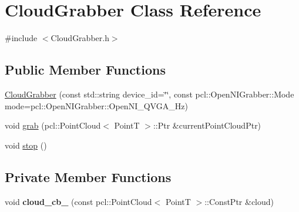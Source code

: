 \hypertarget{classCloudGrabber}{\section{Cloud\-Grabber Class Reference}
\label{classCloudGrabber}
}


{\ttfamily \#include $<$Cloud\-Grabber.\-h$>$}

\subsection*{Public Member Functions}
\begin{DoxyCompactItemize}
\item 
\hyperlink{classCloudGrabber_a0588e520a70880ab4ac1f8052954b956}{Cloud\-Grabber} (const std\-::string device\-\_\-id=\char`\"{}\char`\"{}, const pcl\-::\-Open\-N\-I\-Grabber\-::\-Mode mode=pcl\-::\-Open\-N\-I\-Grabber\-::\-Open\-N\-I\-\_\-\-Q\-V\-G\-A\-\_\-Hz)
\item 
void \hyperlink{classCloudGrabber_aa43eeeef0931d284e5fcf65669e3cbb8}{grab} (pcl\-::\-Point\-Cloud$<$ Point\-T $>$\-::Ptr \&current\-Point\-Cloud\-Ptr)
\item 
void \hyperlink{classCloudGrabber_af97ce184e7835e93b19819a46247b168}{stop} ()
\end{DoxyCompactItemize}
\subsection*{Private Member Functions}
\begin{DoxyCompactItemize}
\item 
\hypertarget{classCloudGrabber_aa3e4c82f3a31773886c4dbcfc730cfe7}{void {\bfseries cloud\-\_\-cb\-\_\-} (const pcl\-::\-Point\-Cloud$<$ Point\-T $>$\-::Const\-Ptr \&cloud)}\label{classCloudGrabber_aa3e4c82f3a31773886c4dbcfc730cfe7}

\end{DoxyCompactItemize}
